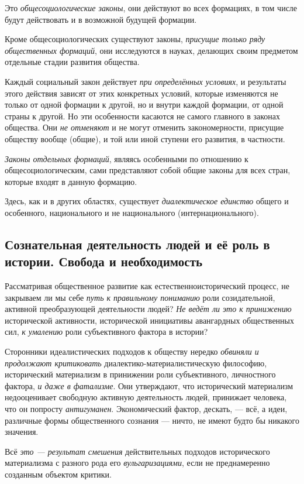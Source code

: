 \documentclass[a4paper,14pt,russian]{extreport}
\begin{document}
Это \emph{общесоциологические законы}, они действуют во всех формациях, в том числе будут действовать и в возможной будущей формации.

Кроме общесоциологических существуют законы, \emph{присущие только ряду общественных формаций}, они исследуются в науках, делающих своим предметом отдельные стадии развития общества.

Каждый социальный закон действует \emph{при определённых условиях}, и результаты этого действия зависят от этих конкретных условий, которые изменяются не только от одной формации к другой, но и внутри каждой формации, от одной страны к другой. Но эти особенности касаются не самого главного в законах общества. Они \emph{не отменяют} и не могут отменить закономерности, присущие обществу вообще (общие), и той или иной ступени его развития, в частности.

\emph{Законы отдельных формаций}, являясь особенными по отношению к общесоциологическим, сами представляют собой общие законы для всех стран, которые входят в данную формацию.

Здесь, как и в других областях, существует \emph{диалектическое единство} общего и особенного, национального и не национального (интернационального).

\subsection{Сознательная деятельность людей и её роль в истории. Свобода и необходимость}

Рассматривая общественное развитие как естественноисторический процесс, не закрываем ли мы себе \emph{путь к правильному пониманию} роли созидательной, активной преобразующей деятельности людей? \emph{Не ведёт ли это к принижению} исторической активности, исторической инициативы авангардных общественных сил, \emph{к умалению} роли субъективного фактора в истории?

Сторонники идеалистических подходов к обществу нередко \emph{обвиняли и продолжают критиковать} диалектико-материалистическую философию, исторический материализм в принижении роли субъективного, личностного фактора, \emph{и даже в фатализме}. Они утверждают, что исторический материализм недооценивает свободную активную деятельность людей, принижает человека, что он попросту \emph{антигуманен}. Экономический фактор, дескать, --- всё, а идеи, различные формы общественного сознания --- ничто, не имеют будто бы никакого значения.

Всё \emph{это --- результат смешения} действительных подходов исторического материализма с разного рода его \emph{вульгаризациями}, если не преднамеренно созданным объектом критики.
\end{document}
